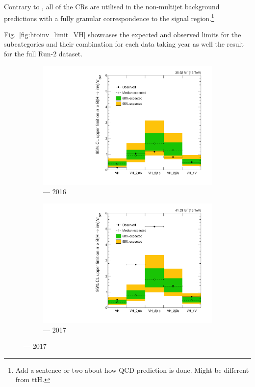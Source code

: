 Contrary to \ttH, all of the \glspl{CR} are utilised in the non-multijet background predictions with a fully granular correspondence to the signal region.\footnote{Add a sentence or two about how QCD prediction is done. Might be different from ttH.}

Fig.~\ref{fig:htoinv_limit_VH} showcases the expected and observed limits for the \VH subcategories and their combination for each data taking year as well the result for the full Run-2 dataset.

\begin{figure}[htbp]
    \centering
    \begin{subfigure}[b]{0.45\textwidth}
        \includegraphics[width=\textwidth]{figures/limits/VH/limit_2016_VH.pdf}
        \caption{\VH --- 2016}
    \end{subfigure}
    \hfill
    \begin{subfigure}[b]{0.45\textwidth}
        \includegraphics[width=\textwidth]{figures/limits/VH/limit_2017_VH.pdf}
        \caption{\VH --- 2017}
    \end{subfigure}


\end{figure}
